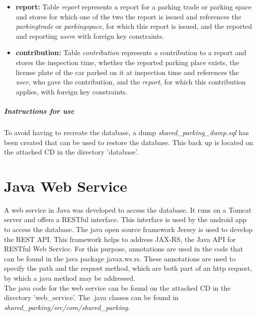 \begin{itemize}
\item \textbf{report:} Table \textit{report} represents a report for a parking trade or parking space and stores for which one of the two the report is issued and references the \textit{parkingtrade} or \textit{parkingspace}, for which this report is issued, and the reported and reporting \textit{user}s with foreign key constraints.
\item \textbf{contribution:} Table \textit{contribution} represents a contribution to a report and stores the inspection time, whether the reported parking place exists, the license plate of the car parked on it at inspection time and references the \textit{user}, who gave the contribution, and the \textit{report}, for which this contribution applies, with foreign key constraints.
\end{itemize}

\subparagraph{Instructions for use}
To avoid having to recreate the database, a dump \textit{shared\_parking\_dump.sql} has been created that can be used to restore the database. This back up is located on the attached CD in the directory 'database'.

\section{Java Web Service}
A web service in Java was developed to access the database. It runs on a Tomcat server and offers a RESTful interface. This interface is used by the android app to access the database. The java open source framework Jersey is used to develop the REST API. This framework helps to address JAX-RS, the Java API for RESTful Web Service. For this purpose, annotations are used in the code that can be found in the java package javax.ws.rs. These annotations are used to specify the path and the request method, which are both part of an http request, by which a java method may be addressed.\\

The java code for the web service can be found on the attached CD in the directory 'web\_service'. The .java classes can be found in \textit{shared\_parking/src/com/shared\_parking}.

